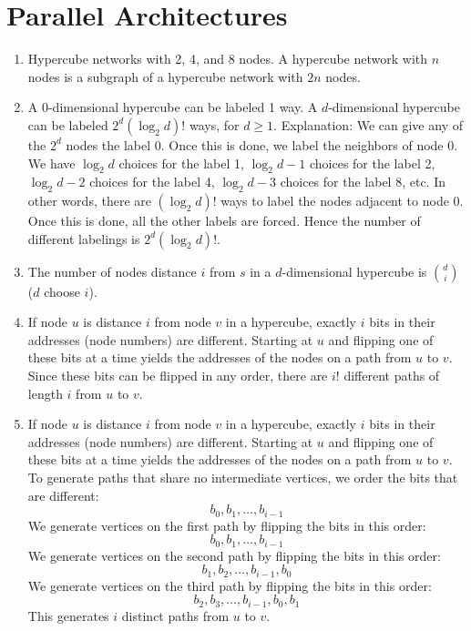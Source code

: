 \chapter{Parallel Architectures}

\begin{enumerate}
\item  Hypercube networks with 2, 4, and 8 nodes. A hypercube network with
       $n$ nodes is a subgraph of a hypercube network with $2n$ nodes.
       \begin{center}
       \end{center}

\item  A 0-dimensional hypercube can be labeled 1 way.
       A $d$-dimensional hypercube can be labeled $2^d(\log_2 d)!$ ways,
       for $d \ge 1$. Explanation: We can give any of the $2^d$ nodes the
       label 0. Once this is done, we label the neighbors of node 0.
       We have $\log_2 d$ choices for the label 1,
       $\log_2 d - 1$ choices for the label 2,
       $\log_2 d - 2$ choices for the label 4,
       $\log_2 d - 3$ choices for the label 8, etc. In other words,
       there are $(\log_2 d)!$ ways to label the nodes adjacent to node 0.
       Once this is done, all the other labels are forced.
       Hence the number of different labelings is $2^d(\log_2 d)!$.

\item  The number of nodes distance $i$ from $s$ in a $d$-dimensional
       hypercube is $d \choose i$ ($d$ choose $i$).

\item  If node $u$ is distance $i$ from node $v$ in a hypercube, exactly $i$
       bits in their addresses (node numbers) are different.
       Starting at $u$ and flipping one of these bits at a time yields the
       addresses of the nodes on a path from $u$ to $v$. Since these bits
       can be flipped in any order, there are $i!$ different paths of length
       $i$ from $u$ to $v$.

\item  If node $u$ is distance $i$ from node $v$ in a hypercube, exactly $i$
       bits in their addresses (node numbers) are different.
       Starting at $u$ and flipping one of these bits at a time yields the
       addresses of the nodes on a path from $u$ to $v$.
       To generate paths that share no intermediate vertices, we order the
       bits that are different:
       $$b_0, b_1, \ldots, b_{i-1}$$
       We generate vertices on the first path by flipping the bits
       in this order:
       $$b_0, b_1, \ldots, b_{i-1}$$
       We generate vertices on the second path by flipping the bits
       in this order:
       $$b_1, b_2, \ldots, b_{i-1}, b_0$$
       We generate vertices on the third path by flipping the bits
       in this order:
       $$b_2, b_3, \ldots, b_{i-1}, b_0, b_1$$
       This generates $i$ distinct paths from $u$ to $v$.


\end{enumerate}
